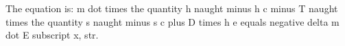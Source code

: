 The equation is: m dot times the quantity h naught minus h c minus T naught times the quantity s naught minus s c plus D times h e equals negative delta m dot E subscript x, str.